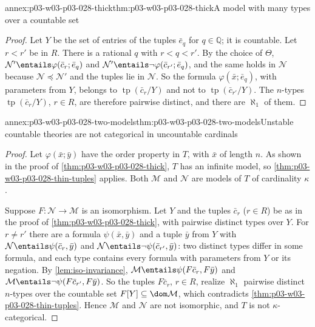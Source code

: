 \begin{annexitem}{annex:p03-w03-p03-028-thick}{thm:p03-w03-p03-028-thick}{A model with many types over a countable set}
\begin{proof}
Let \(Y\) be the set of entries of the tuples \(\bar e_q\) for
\(q\in\mathbb Q\); it is countable.  Let \(r<r'\) be in \(R\).  There is a
rational \(q\) with \(r<q<r'\).  By the choice of \(\Theta\),
\(\mathcal N'\entails\varphi(\bar c_r;\bar e_q)\) and
\(\mathcal N'\entails\neg\varphi(\bar c_{r'};\bar e_q)\), and the same holds
in \(\mathcal N\) because \(\mathcal N\preccurlyeq\mathcal N'\) and the
tuples lie in \(\mathcal N\).  So the formula \(\varphi(\bar x;\bar e_q)\),
with parameters from \(Y\), belongs to
\(\operatorname{tp}(\bar c_r/Y)\) and not to
\(\operatorname{tp}(\bar c_{r'}/Y)\).  The \(n\)-types
\(\operatorname{tp}(\bar c_r/Y)\), \(r\in R\), are therefore pairwise
distinct, and there are \(\aleph_1\) of them.
\end{proof}
\end{annexitem}

\begin{annexitem}{annex:p03-w03-p03-028-two-models}{thm:p03-w03-p03-028-two-models}{Unstable countable theories are not categorical in uncountable cardinals}
\begin{proof}
Let \(\varphi(\bar x;\bar y)\) have the order property in \(T\), with
\(\bar x\) of length \(n\).  As shown in the proof of
\cref{thm:p03-w03-p03-028-thick}, \(T\) has an infinite model, so
\cref{thm:p03-w03-p03-028-thin-tuples} applies.  Both \(\mathcal M\) and
\(\mathcal N\) are models of \(T\) of cardinality \(\kappa\).

Suppose \(F\colon\mathcal N\to\mathcal M\) is an isomorphism.  Let \(Y\)
and the tuples \(\bar c_r\) (\(r\in R\)) be as in the proof of
\cref{thm:p03-w03-p03-028-thick}, with pairwise distinct types over
\(Y\).  For \(r\neq r'\) there are a formula \(\psi(\bar x,\bar y)\) and a
tuple \(\bar y\) from \(Y\) with \(\mathcal N\entails\psi(\bar c_r,\bar
y)\) and \(\mathcal N\entails\neg\psi(\bar c_{r'},\bar y)\): two distinct
types differ in some formula, and each type contains every formula with
parameters from \(Y\) or its negation.  By \cref{lem:iso-invariance},
\(\mathcal M\entails\psi(F\bar c_r,F\bar y)\) and
\(\mathcal M\entails\neg\psi(F\bar c_{r'},F\bar y)\).  So the tuples
\(F\bar c_r\), \(r\in R\), realize \(\aleph_1\) pairwise distinct
\(n\)-types over the countable set \(F[Y]\subseteq\dom\mathcal M\), which
contradicts \cref{thm:p03-w03-p03-028-thin-tuples}.  Hence \(\mathcal M\)
and \(\mathcal N\) are not isomorphic, and \(T\) is not
\(\kappa\)-categorical.
\end{proof}
\end{annexitem}
